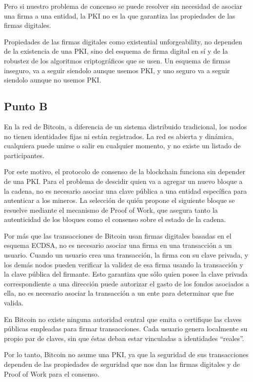 \documentclass[12pt]{article}
\begin{document}
Pero si nuestro problema de concenso se puede resolver sin necesidad de asociar una firma a una entidad, la PKI no es la que garantiza las propiedades de las firmas digitales. 

Propiedades de las firmas digitales como existential unforgeability, no dependen de la existencia de una PKI, sino del esquema de firma digital en sí y de la robustez de los algoritmos criptográficos que se usen. Un esquema de firmas inseguro, va a seguir siendolo aunque usemos PKI, y uno seguro va a seguir siendolo aunque no usemos PKI. 

\subsection*{Punto B}

En la red de Bitcoin, a diferencia de un sistema distribuido tradicional, los nodos no tienen identidades fijas ni están registrados. 
La red es abierta y dinámica, cualquiera puede unirse o salir en cualquier momento, y no existe un listado de participantes.

Por este motivo, el protocolo de consenso de la blockchain funciona sin depender de una PKI. 
Para el problema de descidir quien va a agregar un nuevo bloque a la cadena, no es necesario asociar una clave pública a una entidad específica para autenticar a los mineros. La selección de quién propone el siguiente bloque se resuelve mediante el mecanismo de Proof of Work, que asegura tanto la autenticidad de los bloques como el consenso sobre el estado de la cadena.

Por más que las transacciones de Bitcoin usan firmas digitales basadas en el esquema ECDSA, no es necesario asociar una firma en una transacción a un usuario. 
Cuando un usuario crea una transacción, la firma con su clave privada, y los demás nodos pueden verificar la validez de esa firma usando la transacción y la clave pública del firmante. 
Esto garantiza que sólo quien posee la clave privada correspondiente a una dirección puede autorizar el gasto de los fondos asociados a ella, no es necesario asociar la transacción a un ente para determinar que fue valida. 

En Bitcoin no existe ninguna autoridad central que emita o certifique las claves públicas empleadas para firmar transacciones. 
Cada usuario genera localmente su propio par de claves, sin que éstas deban estar vinculadas a identidades “reales”.

Por lo tanto, Bitcoin no asume una PKI, ya que la seguridad de sus transacciones dependen de las propiedades de seguridad que nos dan las firmas digitales y de Proof of Work para el consenso.  
\end{document}
